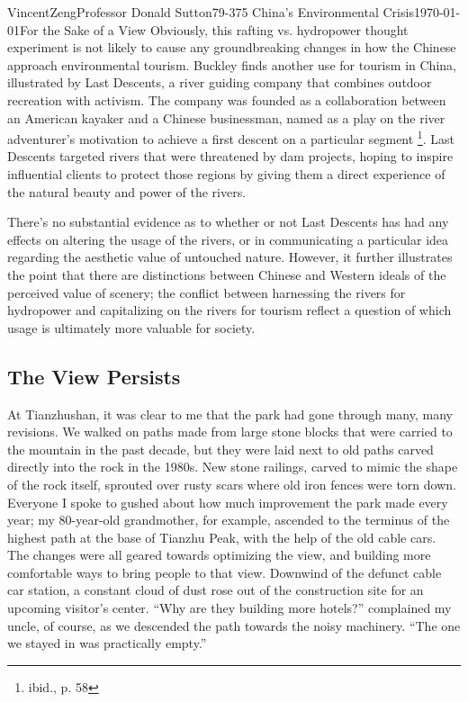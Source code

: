 \documentclass[12pt]{article}
\begin{document}
\begin{mla}{Vincent}{Zeng}{Professor Donald Sutton}{79-375 China's Environmental Crisis}{\today}{For the Sake of a View}
Obviously, this rafting vs. hydropower thought experiment is not likely to
cause any groundbreaking changes in how the Chinese approach environmental
tourism. Buckley finds another use for tourism in China, illustrated by Last
Descents, a river guiding company that combines outdoor recreation with
activism. The company was founded as a collaboration between an American
kayaker and a Chinese businessman, named as a play on the river adventurer's
motivation to achieve a first descent on a particular segment \footnote{ibid.,
p. 58}. Last Descents targeted rivers that were threatened by dam projects,
hoping to inspire influential clients to protect those regions by giving them a
direct experience of the natural beauty and power of the rivers.

There's no substantial evidence as to whether or not Last Descents has had any
effects on altering the usage of the rivers, or in communicating a particular
idea regarding the aesthetic value of untouched nature. However, it further illustrates
the point that there are distinctions between Chinese and Western ideals of the
perceived value of scenery; the conflict between harnessing the rivers for
hydropower and capitalizing on the rivers for tourism reflect a question of
which usage is ultimately more valuable for society.

\subsection*{The View Persists}

At Tianzhushan, it was clear to me that the park had gone through many, many
revisions. We walked on paths made from large stone blocks that were carried to
the mountain in the past decade, but they were laid next to old paths carved
directly into the rock in the 1980s. New stone railings, carved to mimic the
shape of the rock itself, sprouted over rusty scars where old iron fences were
torn down. Everyone I spoke to gushed about how much improvement the park made
every year; my 80-year-old grandmother, for example, ascended to the terminus
of the highest path at the base of Tianzhu Peak, with the help of the old cable
cars. The changes were all geared towards
optimizing the view, and building more comfortable ways to bring people to that view. Downwind
of the defunct cable car station, a constant cloud of dust rose out of the
construction site for an upcoming visitor's center. ``Why are they building more
hotels?'' complained my uncle, of course, as we descended the path towards the
noisy machinery. ``The one we stayed in was practically empty.''


\end{mla}
\end{document}
